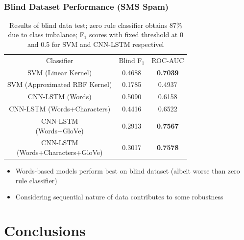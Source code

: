 \documentclass{beamer}
\begin{document}
\subsection{}
\begin{framefont}{\footnotesize}
	\begin{frame}
		\frametitle{Blind Dataset Performance (SMS Spam)}
		\begin{table}
			\centering
			\captionsetup{justification=centering}
			\bgroup
			\def\arraystretch{1.5}
			\begin{tabular}{|c|c|c|} \hline
				Classifier & Blind F$_1$ & ROC-AUC\\ \hhline{|=|=|=|}
				SVM (Linear Kernel) & 0.4688 & \textbf{0.7039} \\ \hline
				SVM (Approximated RBF Kernel) & 0.1785 & 0.4937 \\ \hline
				CNN-LSTM (Words) & 0.5090 & 0.6158 \\ \hline
				CNN-LSTM (Words+Characters) & 0.4416 & 0.6522 \\ \hline
				\makecell{CNN-LSTM \\(Words+GloVe)} & 0.2913 & \textbf{0.7567} \\ \hline
				\makecell{CNN-LSTM \\(Words+Characters+GloVe)} & 0.3017 & \textbf{0.7578} \\ \hline
			\end{tabular}
			\egroup
			\caption{Results of blind data test; zero rule classifier obtains 87\% due to class imbalance; F$_1$ scores with fixed threshold at 0 and 0.5 for SVM and CNN-LSTM respectivel}
		\end{table}
		\vspace{-10pt}
		\begin{itemize}
			\item Words-based models perform best on blind dataset (albeit worse than zero rule classifier)
			\item Considering sequential nature of data contributes to some robustness
		\end{itemize}
	\end{frame}
\end{framefont}

\section{Conclusions}
\end{document}
